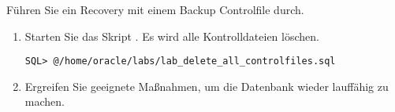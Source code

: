     \item Führen Sie ein Recovery mit einem Backup Controlfile durch.
      \begin{enumerate}
        \item Starten Sie das Skript . Es wird alle Kontrolldateien löschen.
          \begin{lstlisting}[language=terminal]
SQL> @/home/oracle/labs/lab_delete_all_controlfiles.sql
          \end{lstlisting}
        \item Ergreifen Sie geeignete Maßnahmen, um die Datenbank wieder lauffähig zu machen.
      \end{enumerate}

